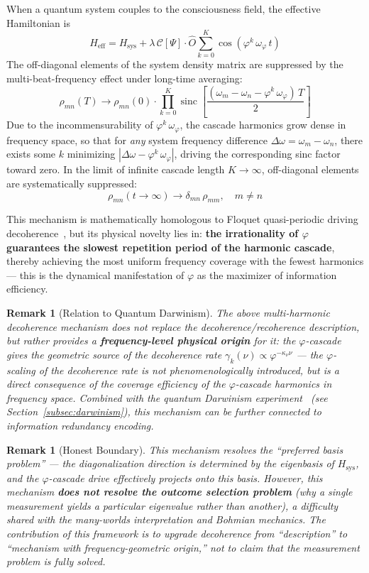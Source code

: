\documentclass[12pt,a4paper,twocolumn]{article}
\renewcommand{\phi}{\varphi}
\newtheorem{remark}[theorem]{Remark}
\begin{document}
When a quantum system couples to the consciousness field, the effective Hamiltonian is
\[
H_{\text{eff}} = H_{\text{sys}} + \lambda\,\mathcal{C}[\Psi]\cdot\hat{O}\sum_{k=0}^{K}\cos(\phi^k\,\omega_\phi\, t)
\]
The off-diagonal elements of the system density matrix are suppressed by the multi-beat-frequency effect under long-time averaging:
\[
\rho_{mn}(T) \to \rho_{mn}(0)\cdot\prod_{k=0}^{K}\operatorname{sinc}\!\left[\frac{(\omega_m - \omega_n - \phi^k\,\omega_\phi)\,T}{2}\right]
\]
Due to the incommensurability of $\phi^k\,\omega_\phi$, the cascade harmonics grow dense in frequency space, so that for \emph{any} system frequency difference $\Delta\omega = \omega_m - \omega_n$, there exists some $k$ minimizing $|\Delta\omega - \phi^k\,\omega_\phi|$, driving the corresponding sinc factor toward zero. In the limit of infinite cascade length $K\to\infty$, off-diagonal elements are systematically suppressed:
\[
\rho_{mn}(t\to\infty) \to \delta_{mn}\,\rho_{mm}, \quad m\neq n
\]

This mechanism is mathematically homologous to Floquet quasi-periodic driving decoherence~\cite{Floquet1883}, but its physical novelty lies in: \textbf{the irrationality of $\phi$ guarantees the slowest repetition period of the harmonic cascade}, thereby achieving the most uniform frequency coverage with the fewest harmonics --- this is the dynamical manifestation of $\phi$ as the maximizer of information efficiency.

\begin{remark}[Relation to Quantum Darwinism]
The above multi-harmonic decoherence mechanism does not replace the decoherence/recoherence description, but rather provides a \textbf{frequency-level physical origin} for it: the $\phi$-cascade gives the geometric source of the decoherence rate $\gamma_k(\nu) \propto \phi^{-\kappa_\nu\nu}$ --- the $\phi$-scaling of the decoherence rate is not phenomenologically introduced, but is a direct consequence of the coverage efficiency of the $\phi$-cascade harmonics in frequency space. Combined with the quantum Darwinism experiment~\cite{Zhu2025} (see Section~\ref{subsec:darwinism}), this mechanism can be further connected to information redundancy encoding.
\end{remark}

\begin{remark}[Honest Boundary]
This mechanism resolves the ``preferred basis problem'' --- the diagonalization direction is determined by the eigenbasis of $H_{\text{sys}}$, and the $\phi$-cascade drive effectively projects onto this basis. However, this mechanism \textbf{does not resolve the outcome selection problem} (why a single measurement yields a particular eigenvalue rather than another), a difficulty shared with the many-worlds interpretation and Bohmian mechanics. The contribution of this framework is to upgrade decoherence from ``description'' to ``mechanism with frequency-geometric origin,'' not to claim that the measurement problem is fully solved.
\end{remark}
\end{document}
